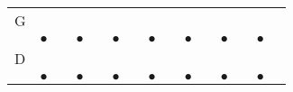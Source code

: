 \documentclass[landscape]{foils}
\begin{document}
{\begin{center}
\begin{tabular}{lclclclclclclcl}
G  & {\color{black} $$} &     & {\color{black} $$ } &     & {\color{black} $$ } & {\color{black} $$} &     & {\color{black} $$ } &     & {\color{black} $$ } & {\color{black} $$} &     & {\color{black} $$ } &       \\
   & {\color{black} $\bullet$}      &    & {\color{black} $\bullet$}        &    & {\color{black}$\bullet$} &    & {\color{black}$\bullet$}&    & {\color{black}$\bullet$}&    & {\color{black}$\bullet$}&    & {\color{black}$\bullet$} \\
D  & {\color{black} $$} &     & {\color{black} $$ } &     & {\color{black} $$ } & {\color{black} $$} &     & {\color{black} $$ } &     & {\color{black} $$ } & {\color{black} $$} &     & {\color{black} $$ } &       \\
  & {\color{black} $\bullet$}      &    & {\color{black} $\bullet$}        &    & {\color{black}$\bullet$} &    & {\color{black}$\bullet$}&    & {\color{black}$\bullet$}&    & {\color{black}$\bullet$}&    & {\color{black}$\bullet$} \\
\end{tabular}
\end{center}
}
\end{document}
